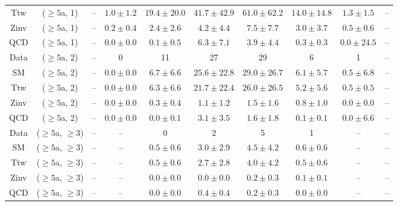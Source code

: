 \begin{table}[h!]
{\begin{tabular}{cccccccccc}
	Ttw & ($\ge5$a, 1) & -- & $1.0\pm 1.2$ & $19.4\pm 20.0$ & $41.7\pm 42.9$ & $61.0\pm 62.2$ & $14.0\pm 14.8$ & $1.3\pm 1.5$ & -- \\[0.5ex] 
	Zinv & ($\ge5$a, 1) & -- & $0.2\pm 0.4$ & $2.4\pm 2.6$ & $4.2\pm 4.4$ & $7.5\pm 7.7$ & $3.0\pm 3.7$ & $0.5\pm 0.6$ & -- \\[0.5ex] 
	QCD & ($\ge5$a, 1) & -- & $0.0\pm 0.0$ & $0.1\pm 0.5$ & $6.3\pm 7.1$ & $3.9\pm 4.4$ & $0.3\pm 0.3$ & $0.0\pm 24.5$ & -- \\[0.5ex] 
	Data & ($\ge5$a, 2) & -- & 0 & 11 & 27 & 29 & 6 & 1 & -- \\[0.5ex] 
	SM & ($\ge5$a, 2) & -- & $0.0\pm 0.0$ & $6.7\pm 6.6$ & $25.6\pm 22.8$ & $29.0\pm 26.7$ & $6.1\pm 5.7$ & $0.5\pm 6.8$ & -- \\[0.5ex] 
	Ttw & ($\ge5$a, 2) & -- & $0.0\pm 0.0$ & $6.3\pm 6.6$ & $21.7\pm 22.4$ & $26.0\pm 26.5$ & $5.2\pm 5.6$ & $0.5\pm 0.5$ & -- \\[0.5ex] 
	Zinv & ($\ge5$a, 2) & -- & $0.0\pm 0.0$ & $0.3\pm 0.4$ & $1.1\pm 1.2$ & $1.5\pm 1.6$ & $0.8\pm 1.0$ & $0.0\pm 0.0$ & -- \\[0.5ex] 
	QCD & ($\ge5$a, 2) & -- & $0.0\pm 0.0$ & $0.0\pm 0.1$ & $3.1\pm 3.5$ & $1.6\pm 1.8$ & $0.1\pm 0.1$ & $0.0\pm 6.6$ & -- \\[0.5ex] 
	Data & ($\ge5$a, $\ge3$) & -- & -- & 0 & 2 & 5 & 1 & -- & -- \\[0.5ex] 
	SM & ($\ge5$a, $\ge3$) & -- & -- & $0.5\pm 0.6$ & $3.0\pm 2.9$ & $4.5\pm 4.2$ & $0.6\pm 0.6$ & -- & -- \\[0.5ex] 
	Ttw & ($\ge5$a, $\ge3$) & -- & -- & $0.5\pm 0.6$ & $2.7\pm 2.8$ & $4.0\pm 4.2$ & $0.5\pm 0.6$ & -- & -- \\[0.5ex] 
	Zinv & ($\ge5$a, $\ge3$) & -- & -- & $0.0\pm 0.0$ & $0.0\pm 0.0$ & $0.2\pm 0.3$ & $0.1\pm 0.1$ & -- & -- \\[0.5ex] 
	QCD & ($\ge5$a, $\ge3$) & -- & -- & $0.0\pm 0.0$ & $0.4\pm 0.4$ & $0.2\pm 0.3$ & $0.0\pm 0.0$ & -- & -- \\[0.5ex] 
	\hline
	\hline
\end{tabular}}
\end{table}
